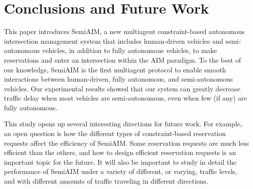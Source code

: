 \section{Conclusions and Future Work}
\label{sec:conclusions}

This paper introduces SemiAIM, a new multiagent constraint-based
autonomous intersection management system that includes human-driven
vehicles and semi-autonomous vehicles, in addition to fully autonomous
vehicles, to make reservations and enter an intersection within the
AIM paradigm.  To the best of our knowledge, SemiAIM is the first
multiagent protocol to enable smooth interactions between
human-driven, fully autonomous, and semi-autonomous vehicles.  Our
experimental results showed that our system can greatly decrease
traffic delay when most vehicles are semi-autonomous, even when few
(if any) are fully autonomous.

This study opens up several interesting directions for future work.
For example, an open question is how the different types of
constraint-based reservation requests affect the efficiency of
SemiAIM. Some reservation requests are much less efficient than the
others, and how to design efficient reservation requests is an
important topic for the future.  It will also be important to study in
detail the performance of SemiAIM under a variety of different, or
varying, traffic levels, and with different amounts of traffic
traveling in different directions.







